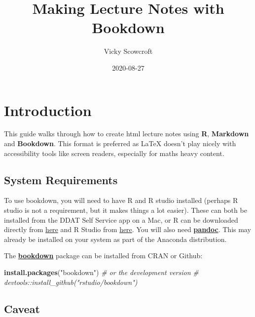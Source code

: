 \documentclass[]{book}
\title{Making Lecture Notes with Bookdown}
\author{Vicky Scowcroft}
\date{2020-08-27}
\newenvironment{Shaded}{\begin{snugshade}}{\end{snugshade}}
\newcommand{\CommentTok}[1]{\textcolor[rgb]{0.56,0.35,0.01}{\textit{#1}}}
\newcommand{\KeywordTok}[1]{\textcolor[rgb]{0.13,0.29,0.53}{\textbf{#1}}}
\newcommand{\NormalTok}[1]{#1}
\newcommand{\StringTok}[1]{\textcolor[rgb]{0.31,0.60,0.02}{#1}}
\begin{document}
\maketitle

{
\setcounter{tocdepth}{1}
\tableofcontents
}
\hypertarget{introduction}{%
\chapter*{Introduction}\label{introduction}}

This guide walks through how to create html lecture notes using \textbf{R}, \textbf{Markdown} and \textbf{Bookdown}. This format is preferred as LaTeX doesn't play nicely with accessibility tools like screen readers, especially for maths heavy content.

\hypertarget{system-requirements}{%
\section*{System Requirements}\label{system-requirements}}

To use bookdown, you will need to have R and R studio installed (perhaps R studio is not a requirement, but it makes things a lot easier). These can both be installed from the DDAT Self Service app on a Mac, or R can be downloaded directly from \href{https://cran.r-project.org/}{here} and R Studio from \href{https://rstudio.com/products/rstudio/download/}{here}. You will also need \href{https://pandoc.org/index.html}{\textbf{pandoc}}. This may already be installed on your system as part of the Anaconda distribution.

The \href{https://bookdown.org/yihui/bookdown/}{\textbf{bookdown}} package can be installed from CRAN or Github:

\begin{Shaded}
\begin{Highlighting}[]
\KeywordTok{install.packages}\NormalTok{(}\StringTok{"bookdown"}\NormalTok{)}
\CommentTok{# or the development version}
\CommentTok{# devtools::install_github("rstudio/bookdown")}
\end{Highlighting}
\end{Shaded}

\hypertarget{caveat}{%
\section*{Caveat}\label{caveat}}
\end{document}
